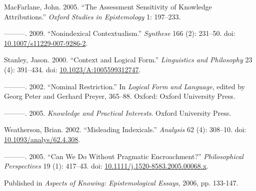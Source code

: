 \documentclass[
  10pt,
  letterpaper,
  DIV=11,
  numbers=noendperiod,
  twoside]{scrartcl}
\newlength{\cslhangindent}
\newenvironment{CSLReferences}[2] %
 {\begin{list}{}{%
  \setlength{\itemindent}{0pt}
  \setlength{\leftmargin}{0pt}
  \setlength{\parsep}{0pt}
  \ifodd #1
   \setlength{\leftmargin}{\cslhangindent}
   \setlength{\itemindent}{-1\cslhangindent}
  \fi
  \setlength{\itemsep}{#2\baselineskip}}}
 {\end{list}}
\begin{document}
\begin{CSLReferences}{1}{0}
MacFarlane, John. 2005. {``The Assessment Sensitivity of Knowledge
Attributions.''} \emph{Oxford Studies in Epistemology} 1: 197--233.

---------. 2009. {``{Nonindexical Contextualism}.''} \emph{Synthese} 166
(2): 231--50. doi:
\href{https://doi.org/10.1007/s11229-007-9286-2}{10.1007/s11229-007-9286-2}.

Stanley, Jason. 2000. {``{Context and Logical Form}.''}
\emph{Linguistics and Philosophy} 23 (4): 391--434. doi:
\href{https://doi.org/10.1023/A:1005599312747}{10.1023/A:1005599312747}.

---------. 2002. {``Nominal Restriction.''} In \emph{Logical Form and
Language}, edited by Georg Peter and Gerhard Preyer, 365--88. Oxford:
Oxford University Press.

---------. 2005. \emph{{Knowledge and Practical Interests}}. Oxford
University Press.

Weatherson, Brian. 2002. {``Misleading Indexicals.''} \emph{Analysis} 62
(4): 308--10. doi:
\href{https://doi.org/10.1093/analys/62.4.308}{10.1093/analys/62.4.308}.

---------. 2005. {``{Can We Do Without Pragmatic Encroachment?}''}
\emph{Philosophical Perspectives} 19 (1): 417--43. doi:
\href{https://doi.org/10.1111/j.1520-8583.2005.00068.x}{10.1111/j.1520-8583.2005.00068.x}.

\end{CSLReferences}



\noindent Published in\emph{
Aspects of Knowing: Epistemological Essays}, 2006, pp. 133-147.
\end{document}
